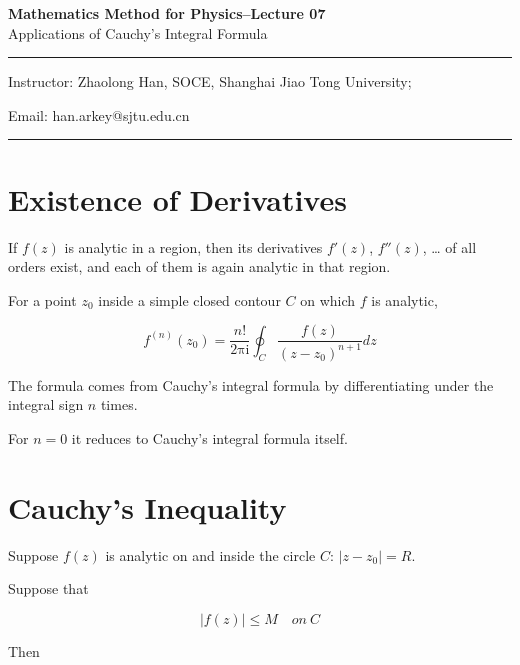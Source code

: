 \documentclass[11pt,a4paper]{article}
\theoremstyle{definition}
\theoremstyle{plain}
\begin{document}
\begin{center}
    {\LARGE \textbf{Mathematics Method for Physics--Lecture 07}} \\[0.6em]
    {\large Applications of Cauchy's Integral Formula}
\end{center}
\vspace{-0.5em}
\noindent\rule{\textwidth}{0.5pt}
\vspace{0.3em}

\begin{center}
    Instructor: Zhaolong Han, SOCE, Shanghai Jiao Tong University;
\end{center}

\vspace{-0.6em}
\noindent Email: han.arkey@sjtu.edu.cn

\vspace{0.4em}
\noindent\rule{\textwidth}{0.5pt}

\vspace{0.8em}

\section{Existence of Derivatives}

If $f(z)$ is analytic in a region, then its derivatives $f'(z)$, $f''(z)$, … of
all orders exist, and each of them is again analytic in that region.

For a point $z_{0}$ inside a simple closed contour $C$ on which $f$ is analytic,

\[
f^{(n)}(z_{0}) = \frac{n!}{2\mathrm{\pi}\mathrm{i}}\oint_{C}\frac{f(z)}{(z - z_{0})^{n + 1}}dz
\]

The formula comes from Cauchy's integral formula by differentiating under the
integral sign $n$ times.

For $n = 0$ it reduces to Cauchy's integral formula itself.

\section{Cauchy's Inequality}

Suppose $f(z)$ is analytic on and inside the circle $C$: $\vert{}z - z_{0}\vert{} = R$.

Suppose that

\begin{equation}
\vert{}f(z)\vert{} \le M\quad on\ C
\end{equation}

Then
\end{document}
